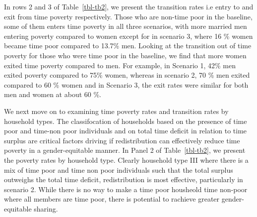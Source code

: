 \documentclass[
  11pt,
]{article}
\begin{document}
In rows 2 and 3 of Table~\ref{tbl-tb2}, we present the transition rates
i.e entry to and exit from time poverty respectively. Those who are
non-time poor in the baseline, some of them enters time poverty in all
three scenarios, with more married men entering poverty compared to
women except for in scenario 3, where 16 \% women became time poor
compared to 13.7\% men. Looking at the transition out of time poverty
for those who were time poor in the baseline, we find that more women
exited time poverty compared to men. For example, in Scenario 1, 42\%
men exited poverty compared to 75\% women, whereas in scenario 2, 70 \%
men exited compared to 60 \% women and in Scenario 3, the exit rates
were similar for both men and women at about 60 \%.

We next move on to examining time poverty rates and transition rates by
household types. The classifocation of households based on the presence
of time poor and time-non poor individuals and on total time deficit in
relation to time surplus are critical factors driving if redistribution
can effectively reduce time poverty in a gender-equitable manner. In
Panel 2 of Table~\ref{tbl-tb2}, we present the poverty rates by
household type. Clearly household type III where there is a mix of time
poor and time non poor individuals such that the total surplus outweighs
the total time deficit, redistribution is most effective, particularly
in scenario 2. While there is no way to make a time poor housheold time
non-poor where all members are time poor, there is potential to rachieve
greater gender-equitable sharing.
\end{document}
